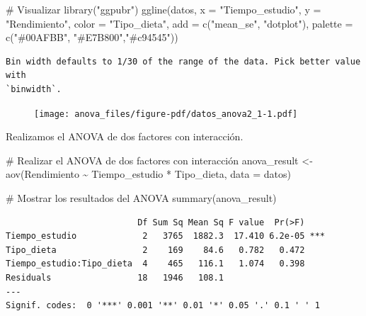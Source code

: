 \documentclass[
  letterpaper,
  DIV=11,
  numbers=noendperiod]{scrreprt}
\newenvironment{Shaded}{\begin{snugshade}}{\end{snugshade}}
\newcommand{\AttributeTok}[1]{\textcolor[rgb]{0.40,0.45,0.13}{#1}}
\newcommand{\CommentTok}[1]{\textcolor[rgb]{0.37,0.37,0.37}{#1}}
\newcommand{\FunctionTok}[1]{\textcolor[rgb]{0.28,0.35,0.67}{#1}}
\newcommand{\NormalTok}[1]{\textcolor[rgb]{0.00,0.23,0.31}{#1}}
\newcommand{\OtherTok}[1]{\textcolor[rgb]{0.00,0.23,0.31}{#1}}
\newcommand{\SpecialCharTok}[1]{\textcolor[rgb]{0.37,0.37,0.37}{#1}}
\newcommand{\StringTok}[1]{\textcolor[rgb]{0.13,0.47,0.30}{#1}}
\begin{document}
\begin{tcolorbox}
\begin{Shaded}
\begin{Highlighting}[]
\CommentTok{\# Visualizar}
\FunctionTok{library}\NormalTok{(}\StringTok{"ggpubr"}\NormalTok{)}
\FunctionTok{ggline}\NormalTok{(datos, }\AttributeTok{x =} \StringTok{"Tiempo\_estudio"}\NormalTok{, }\AttributeTok{y =} \StringTok{"Rendimiento"}\NormalTok{, }\AttributeTok{color =} \StringTok{"Tipo\_dieta"}\NormalTok{,}
       \AttributeTok{add =} \FunctionTok{c}\NormalTok{(}\StringTok{"mean\_se"}\NormalTok{, }\StringTok{"dotplot"}\NormalTok{),}
       \AttributeTok{palette =} \FunctionTok{c}\NormalTok{(}\StringTok{"\#00AFBB"}\NormalTok{, }\StringTok{"\#E7B800"}\NormalTok{,}\StringTok{"\#c94545"}\NormalTok{))}
\end{Highlighting}
\end{Shaded}

\begin{verbatim}
Bin width defaults to 1/30 of the range of the data. Pick better value with
`binwidth`.
\end{verbatim}

\begin{figure}[H]

{\centering \texttt{[image: anova\_files/figure-pdf/datos\_anova2\_1-1.pdf]}

}

\end{figure}

Realizamos el ANOVA de dos factores con interacción.

\begin{Shaded}
\begin{Highlighting}[]
\CommentTok{\# Realizar el ANOVA de dos factores con interacción}
\NormalTok{anova\_result }\OtherTok{\textless{}{-}} \FunctionTok{aov}\NormalTok{(Rendimiento }\SpecialCharTok{\textasciitilde{}}\NormalTok{ Tiempo\_estudio }\SpecialCharTok{*}\NormalTok{ Tipo\_dieta, }\AttributeTok{data =}\NormalTok{ datos)}

\CommentTok{\# Mostrar los resultados del ANOVA}
\FunctionTok{summary}\NormalTok{(anova\_result)}
\end{Highlighting}
\end{Shaded}

\begin{verbatim}
                          Df Sum Sq Mean Sq F value  Pr(>F)    
Tiempo_estudio             2   3765  1882.3  17.410 6.2e-05 ***
Tipo_dieta                 2    169    84.6   0.782   0.472    
Tiempo_estudio:Tipo_dieta  4    465   116.1   1.074   0.398    
Residuals                 18   1946   108.1                    
---
Signif. codes:  0 '***' 0.001 '**' 0.01 '*' 0.05 '.' 0.1 ' ' 1
\end{verbatim}


\end{tcolorbox}
\end{document}
